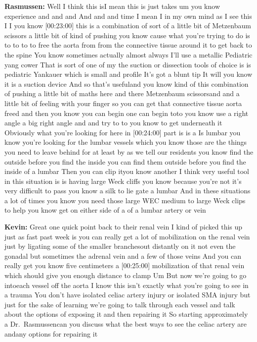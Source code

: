 \documentclass[
]{book}
\begin{document}
\textbf{Rasmussen:} Well I think this isI mean this is just takes um you know
experience and and and And and and time I mean I in my own mind as I see
this I I you know {[}00:23:00{]} this is a combination of sort of a little
bit of Metzenbaum scissors a little bit of kind of pushing you know
cause what you're trying to do is to to to to free the aorta from from
the connective tissue around it to get back to the spine You know
sometimes actually almost always I'll use a metallic Pediatric yang
cower That is sort of one of my the suction or dissection tools of
choice is is pediatric Yankauer which is small and profile It's got a
blunt tip It will you know it is a suction device And so that's
usefuland you know kind of this combination of pushing a little bit of
maths here and there Metzenbaum scissorsand and a little bit of feeling
with your finger so you can get that connective tissue aorta freed and
then you know you can begin one can begin toto you know use a right
angle a big right angle and and try to to you know to get underneath it
Obviously what you're looking for here in {[}00:24:00{]} part is is a Is
lumbar you know you're looking for the lumbar vessels which you know
those are the things you need to leave behind for at least by as we tell
our residents you know find the outside before you find the inside you
can find them outside before you find the inside of a lumbar Then you
can clip ityou know another I think very useful tool in this situation
is is having large Weck cliffs you know because you're not it's very
difficult to pass you know a silk to lie gate a lumbar And in these
situations a lot of times you know you need those large WEC medium to
large Weck clips to help you know get on either side of a of a lumbar
artery or vein

\textbf{Kevin:} Great one quick point back to their renal vein I kind of
picked this up just as fast past week is you can really get a lot of
mobilization on the renal vein just by ligating some of the smaller
branchesout distantly on it not even the gonadal but sometimes the
adrenal vein and a few of those veins And you can really get you know
five centimeters a {[}00:25:00{]} mobilization of that renal vein which
should give you enough distance to clamp Um But now we're going to go
intoeach vessel off the aorta I know this isn't exactly what you're
going to see in a trauma You don't have isolated celiac artery injury or
isolated SMA injury but just for the sake of learning we're going to
talk through each vessel and talk about the options of exposing it and
then repairing it So starting approximately a Dr.~Rasmussencan you
discuss what the best ways to see the celiac artery are andany options
for repairing it
\end{document}

